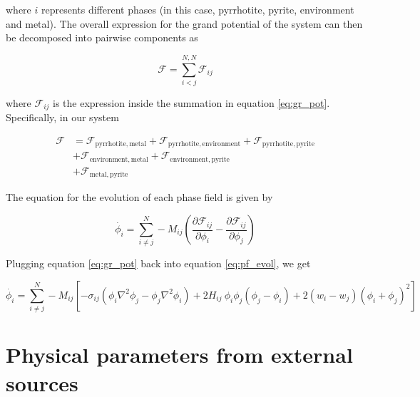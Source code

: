\documentclass{article}
\begin{document}
where $i$ represents different phases (in this case, pyrrhotite, pyrite, environment and metal). The overall expression for the grand potential of the system can then be decomposed into pairwise components as

\begin{equation}
  \mathcal{F} = \sum\limits_{i<j}^{N,N}\mathcal{F}_{ij}
\end{equation}


where $\mathcal{F}_{ij}$ is the expression inside the summation in equation \ref{eq:gr_pot}. Specifically, in our system

\begin{equation}\label{eq:split_f}
  \begin{split}
  \mathcal{F} &= \mathcal{F}_{\mathrm{pyrrhotite,metal}} + \mathcal{F}_{\mathrm{pyrrhotite,environment}} + \mathcal{F}_{\mathrm{pyrrhotite,pyrite}} \\
              &+ \mathcal{F}_{\mathrm{environment,metal}} + \mathcal{F}_{\mathrm{environment,pyrite}} \\
              &+ \mathcal{F}_{\mathrm{metal,pyrite}}    
  \end{split}
\end{equation}


The equation for the evolution of each phase field is given by


\begin{equation}\label{eq:pf_evol}
  \dot{\phi_i} = \sum\limits_{i\neq j}^N -M_{ij}\left(  \frac{\partial\mathcal{F}_{ij}}{\partial \phi_i} - \frac{\partial\mathcal{F}_{ij}}{\partial \phi_j}  \right)
\end{equation}


Plugging equation \ref{eq:gr_pot} back into equation \ref{eq:pf_evol}, we get

\begin{equation}
  \dot{\phi_i} = \sum\limits_{i\neq j}^N -M_{ij}\left[ -\sigma_{ij}\left(\phi_i\nabla^2\phi_j-\phi_j\nabla^2\phi_i\right) + 2H_{ij}\ \phi_i\phi_j (\phi_j-\phi_i) + 2(w_i-w_j)(\phi_i+\phi_j)^2\right]
\end{equation}













\section{Physical parameters from external sources}
\end{document}
